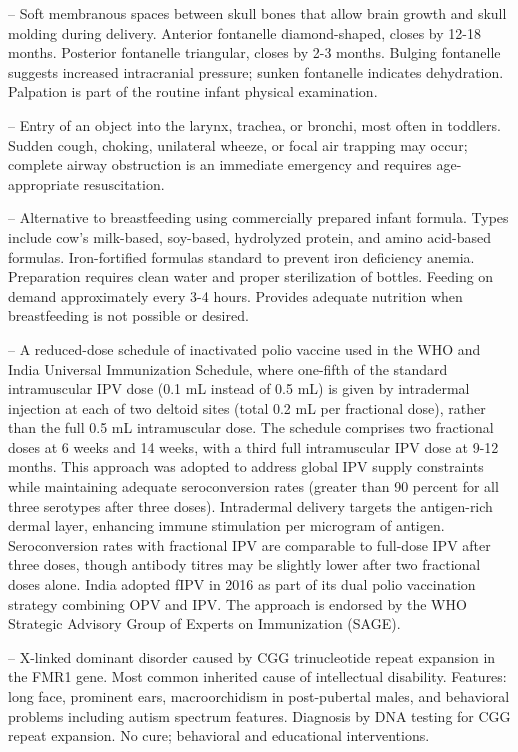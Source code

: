 -- Soft membranous spaces between skull bones that allow brain growth and skull molding during delivery. Anterior fontanelle diamond-shaped, closes by 12-18 months. Posterior fontanelle triangular, closes by 2-3 months. Bulging fontanelle suggests increased intracranial pressure; sunken fontanelle indicates dehydration. Palpation is part of the routine infant physical examination.

-- Entry of an object into the larynx, trachea, or bronchi, most often in toddlers. Sudden cough, choking, unilateral wheeze, or focal air trapping may occur; complete airway obstruction is an immediate emergency and requires age-appropriate resuscitation.

-- Alternative to breastfeeding using commercially prepared infant formula. Types include cow's milk-based, soy-based, hydrolyzed protein, and amino acid-based formulas. Iron-fortified formulas standard to prevent iron deficiency anemia. Preparation requires clean water and proper sterilization of bottles. Feeding on demand approximately every 3-4 hours. Provides adequate nutrition when breastfeeding is not possible or desired.

-- A reduced-dose schedule of inactivated polio vaccine used in the WHO and India Universal Immunization Schedule, where one-fifth of the standard intramuscular IPV dose (0.1 mL instead of 0.5 mL) is given by intradermal injection at each of two deltoid sites (total 0.2 mL per fractional dose), rather than the full 0.5 mL intramuscular dose. The schedule comprises two fractional doses at 6 weeks and 14 weeks, with a third full intramuscular IPV dose at 9-12 months. This approach was adopted to address global IPV supply constraints while maintaining adequate seroconversion rates (greater than 90 percent for all three serotypes after three doses). Intradermal delivery targets the antigen-rich dermal layer, enhancing immune stimulation per microgram of antigen. Seroconversion rates with fractional IPV are comparable to full-dose IPV after three doses, though antibody titres may be slightly lower after two fractional doses alone. India adopted fIPV in 2016 as part of its dual polio vaccination strategy combining OPV and IPV. The approach is endorsed by the WHO Strategic Advisory Group of Experts on Immunization (SAGE).

-- X-linked dominant disorder caused by CGG trinucleotide repeat expansion in the FMR1 gene. Most common inherited cause of intellectual disability. Features: long face, prominent ears, macroorchidism in post-pubertal males, and behavioral problems including autism spectrum features. Diagnosis by DNA testing for CGG repeat expansion. No cure; behavioral and educational interventions.

